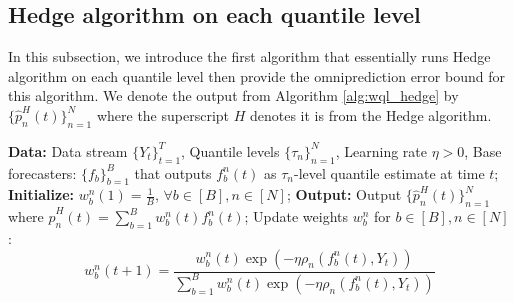 \subsection{Hedge algorithm on each quantile level} \label{subsec:hedge_wql}
In this subsection, we introduce the first algorithm that essentially runs Hedge algorithm on each quantile level then provide the omniprediction error bound for this algorithm. We denote the output from Algorithm \ref{alg:wql_hedge} by $\{\hat{p}_n^H(t)\}_{n=1}^N$ where the superscript $H$ denotes it is from the Hedge algorithm.
 
\begin{algorithm}[h]
\caption{Hedge algorithm for multiple quantile levels in parallel} \label{alg:wql_hedge}
\begin{algorithmic}[1]
\State \textbf{Data:} Data stream $\{Y_t\}_{t=1}^T$, Quantile levels $\{\tau_n\}_{n=1}^N$, Learning rate $\eta> 0$, Base forecasters: $\{f_b\}_{b=1}^B$ that outputs $f_b^n(t)$ as $\tau_n$-level quantile estimate at time $t$;
\State \textbf{Initialize:} $w_{b}^n(1) = \frac{1}{B}$, $\forall b \in [B], n \in [N]$;
    \State \textbf{Output:} Output $\{\hat{p}_n^H(t)\}_{n=1}^N$ where $\hat{p}_n^H(t) = \sum_{b=1}^B w_{b}^n(t) f_b^n(t)$;
    \State Update weights $w_{b}^n$ for $b \in [B], n \in [N]$:
    \[
    w_{b}^n(t+1) 
    = \frac{w_{b}^n(t) \exp\left(-\eta \rho_n(f_b^n(t), Y_t)\right)}{\sum_{b=1}^B w_{b}^n(t) \exp\left(-\eta \rho_n(f_b^n(t), Y_t)\right)}
    \]
\EndFor
\end{algorithmic}
\end{algorithm}


